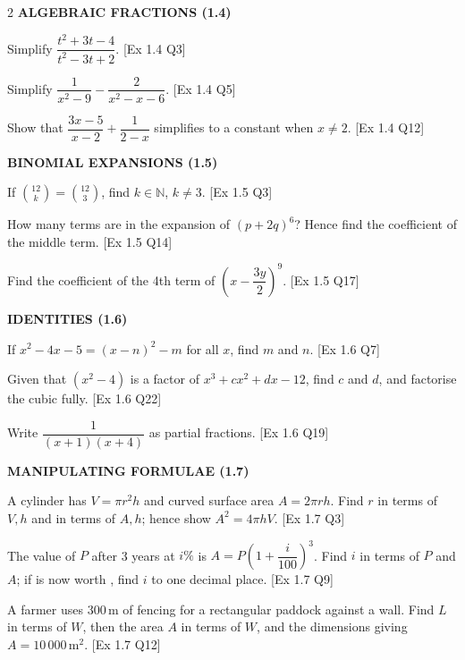 \documentclass[11pt]{article}
\newcommand{\bk}[1]{{\footnotesize\color{greyish}[#1]}}
\begin{document}
\begin{multicols}{2}
{\color{lilacdeep}\footnotesize\bfseries ALGEBRAIC FRACTIONS (1.4)}
\begin{qlist}[resume]
\item Simplify $\dfrac{t^{2}+3t-4}{t^{2}-3t+2}$. \bk{Ex 1.4 Q3}
\item Simplify $\dfrac{1}{x^{2}-9}-\dfrac{2}{x^{2}-x-6}$. \bk{Ex 1.4 Q5}
\item Show that $\dfrac{3x-5}{x-2}+\dfrac{1}{2-x}$ simplifies to a constant when $x\neq2$. \bk{Ex 1.4 Q12}
\end{qlist}

{\color{lilacdeep}\footnotesize\bfseries BINOMIAL EXPANSIONS (1.5)}
\begin{qlist}[resume]
\item If $\binom{12}{k}=\binom{12}{3}$, find $k\in\mathbb N$, $k\neq3$. \bk{Ex 1.5 Q3}
\item How many terms are in the expansion of $(p+2q)^{6}$? Hence find the coefficient of the middle term. \bk{Ex 1.5 Q14}
\item Find the coefficient of the 4th term of $\left(x-\dfrac{3y}{2}\right)^{9}$. \bk{Ex 1.5 Q17}
\end{qlist}

{\color{lilacdeep}\footnotesize\bfseries IDENTITIES (1.6)}
\begin{qlist}[resume]
\item If $x^{2}-4x-5=(x-n)^{2}-m$ for all $x$, find $m$ and $n$. \bk{Ex 1.6 Q7}
\item Given that $(x^{2}-4)$ is a factor of $x^{3}+cx^{2}+dx-12$, find $c$ and $d$, and factorise the cubic fully. \bk{Ex 1.6 Q22}
\item Write $\dfrac{1}{(x+1)(x+4)}$ as partial fractions. \bk{Ex 1.6 Q19}
\end{qlist}

{\color{lilacdeep}\footnotesize\bfseries MANIPULATING FORMULAE (1.7)}
\begin{qlist}[resume]
\item A cylinder has $V=\pi r^{2}h$ and curved surface area $A=2\pi rh$. Find $r$ in terms of $V,h$ and in terms of $A,h$; hence show $A^{2}=4\pi hV$. \bk{Ex 1.7 Q3}
\item The value of \texteuro$P$ after 3 years at $i\%$ is $A=P\left(1+\dfrac{i}{100}\right)^{3}$. Find $i$ in terms of $P$ and $A$; if  is now worth , find $i$ to one decimal place. \bk{Ex 1.7 Q9}
\item A farmer uses 300\,m of fencing for a rectangular paddock against a wall. Find $L$ in terms of $W$, then the area $A$ in terms of $W$, and the dimensions giving $A=10\,000$\,m$^{2}$. \bk{Ex 1.7 Q12}
\end{qlist}


\end{multicols}
\end{document}
